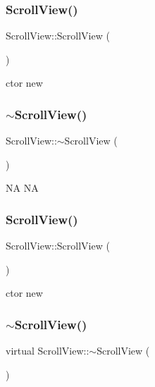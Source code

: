 \subsubsection{\texorpdfstring{Scroll\+View()}{ScrollView()}\hspace{0.1cm}{\footnotesize\ttfamily [1/2]}}
{\footnotesize\ttfamily Scroll\+View\+::\+Scroll\+View (\begin{DoxyParamCaption}{ }\end{DoxyParamCaption})}

ctor  new \mbox{\label{classScrollView_a4a5220ac36e0c7d03973be1bdde8d7a1}} 
\subsubsection{\texorpdfstring{$\sim$\+Scroll\+View()}{~ScrollView()}\hspace{0.1cm}{\footnotesize\ttfamily [1/2]}}
{\footnotesize\ttfamily Scroll\+View\+::$\sim$\+Scroll\+View (\begin{DoxyParamCaption}{ }\end{DoxyParamCaption})\hspace{0.3cm}{\ttfamily [virtual]}}

NA  NA \mbox{\label{classScrollView_afe9273a62ee4829f87d13a22e0576ac7}} 
\subsubsection{\texorpdfstring{Scroll\+View()}{ScrollView()}\hspace{0.1cm}{\footnotesize\ttfamily [2/2]}}
{\footnotesize\ttfamily Scroll\+View\+::\+Scroll\+View (\begin{DoxyParamCaption}{ }\end{DoxyParamCaption})}

ctor  new \mbox{\label{classScrollView_a0bacfb202cd2daa890445aeb544fd17e}} 
\subsubsection{\texorpdfstring{$\sim$\+Scroll\+View()}{~ScrollView()}\hspace{0.1cm}{\footnotesize\ttfamily [2/2]}}
{\footnotesize\ttfamily virtual Scroll\+View\+::$\sim$\+Scroll\+View (\begin{DoxyParamCaption}{ }\end{DoxyParamCaption})\hspace{0.3cm}{\ttfamily [virtual]}}

